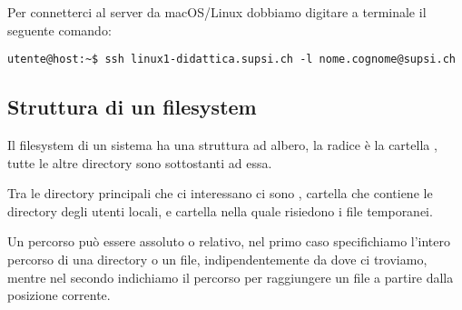 \documentclass[../main.tex]{subfiles}
\begin{document}
Per connetterci al server da macOS/Linux dobbiamo digitare a terminale il seguente comando:
\begin{lstlisting}[style=bash]
    utente@host:~$ ssh linux1-didattica.supsi.ch -l nome.cognome@supsi.ch
\end{lstlisting}

\subsection{Struttura di un filesystem}
Il filesystem di un sistema ha una struttura ad albero, la radice è la cartella , tutte le altre directory sono sottostanti ad essa.

Tra le directory principali che ci interessano ci sono , cartella che contiene le directory degli utenti locali, e  cartella nella quale risiedono i file temporanei.

Un percorso può essere assoluto o relativo, nel primo caso specifichiamo l'intero percorso di una directory o un file, indipendentemente da dove ci troviamo, mentre nel secondo indichiamo il percorso per raggiungere un file a partire dalla posizione corrente.
\end{document}
